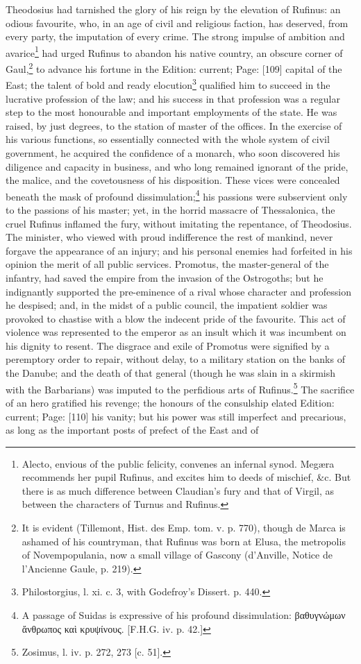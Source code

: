 Theodosius had tarnished the glory of his reign by the elevation of Rufinus: an odious favourite, who, in an age of civil and religious faction, has deserved, from every party, the imputation of every crime. The strong impulse of ambition and avarice\footnote{Alecto, envious of the public felicity, convenes an infernal synod. Megæra recommends her pupil Rufinus, and excites him to deeds of mischief, \&c. But there is as much difference between Claudian\texthebrew{}’s fury and that of Virgil, as between the characters of Turnus and Rufinus.} had urged Rufinus to abandon his native country, an obscure corner of Gaul,\footnote{It is evident (Tillemont, Hist. des Emp. tom. v. p. 770), though de Marca is ashamed of his countryman, that Rufinus was born at Elusa, the metropolis of Novempopulania, now a small village of Gascony (d\texthebrew{}’Anville, Notice de l\texthebrew{}’Ancienne Gaule, p. 219).} to advance his fortune in the Edition: current; Page: [109] capital of the East; the talent of bold and ready elocution\footnote{Philostorgius, l. xi. c. 3, with Godefroy\texthebrew{}’s Dissert. p. 440.} qualified him to succeed in the lucrative profession of the law; and his success in that profession was a regular step to the most honourable and important employments of the state. He was raised, by just degrees, to the station of master of the offices. In the exercise of his various functions, so essentially connected with the whole system of civil government, he acquired the confidence of a monarch, who soon discovered his diligence and capacity in business, and who long remained ignorant of the pride, the malice, and the covetousness of his disposition. These vices were concealed beneath the mask of profound dissimulation;\footnote{A passage of Suidas is expressive of his profound dissimulation: \textgreek{βαθυγνώμων \texthebrew{ἄ}νθρωπος κα\texthebrew{ὶ} κρυψίνους}. [F.H.G. iv. p. 42.]} his passions were subservient only to the passions of his master; yet, in the horrid massacre of Thessalonica, the cruel Rufinus inflamed the fury, without imitating the repentance, of Theodosius. The minister, who viewed with proud indifference the rest of mankind, never forgave the appearance of an injury; and his personal enemies had forfeited in his opinion the merit of all public services. Promotus, the master-general of the infantry, had saved the empire from the invasion of the Ostrogoths; but he indignantly supported the pre-eminence of a rival whose character and profession he despised; and, in the midst of a public council, the impatient soldier was provoked to chastise with a blow the indecent pride of the favourite. This act of violence was represented to the emperor as an insult which it was incumbent on his dignity to resent. The disgrace and exile of Promotus were signified by a peremptory order to repair, without delay, to a military station on the banks of the Danube; and the death of that general (though he was slain in a skirmish with the Barbarians) was imputed to the perfidious arts of Rufinus.\footnote{Zosimus, l. iv. p. 272, 273 [c. 51].} The sacrifice of an hero gratified his revenge; the honours of the consulship elated Edition: current; Page: [110] his vanity; but his power was still imperfect and precarious, as long as the important posts of prefect of the East and of 